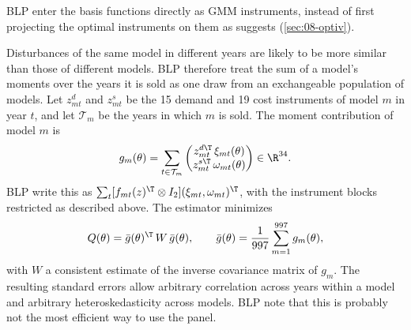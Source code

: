 BLP enter the basis functions directly as GMM instruments, instead of first projecting the optimal
instruments on them as \citet{Newey1990} suggests (\cref{sec:08-optiv}).

Disturbances of the same model in different years are likely to be more similar than those of
different models. BLP therefore treat the sum of a model's moments over the years it is sold as one
draw from an exchangeable population of models. Let $z^d_{mt}$ and $z^s_{mt}$ be the 15 demand and 19
cost instruments of model $m$ in year $t$, and let $\mathcal{T}_m$ be the years in which $m$ is sold.
The moment contribution of model $m$ is
\begin{equation}\label{eq:08-blp-gm}
g_m(\theta)=\sum_{t\in\mathcal{T}_m}\begin{pmatrix} z^{d\T}_{mt}\,\xi_{mt}(\theta)\\
z^{s\T}_{mt}\,\omega_{mt}(\theta)\end{pmatrix}\in\R^{34}.
\end{equation}
BLP write this as $\sum_t[f_{mt}(z)^{\T}\otimes I_2](\xi_{mt},\omega_{mt})^{\T}$, with the
instrument blocks restricted as described above. The estimator minimizes
\begin{equation}\label{eq:08-blp-obj}
Q(\theta)=\bar g(\theta)^{\T}\,W\,\bar g(\theta),\qquad
\bar g(\theta)=\frac{1}{997}\sum_{m=1}^{997}g_m(\theta),
\end{equation}
with $W$ a consistent estimate of the inverse covariance matrix of $g_m$. The resulting standard errors
allow arbitrary correlation across years within a model and arbitrary heteroskedasticity across
models. BLP note that this is probably not the most efficient way to use the panel.

